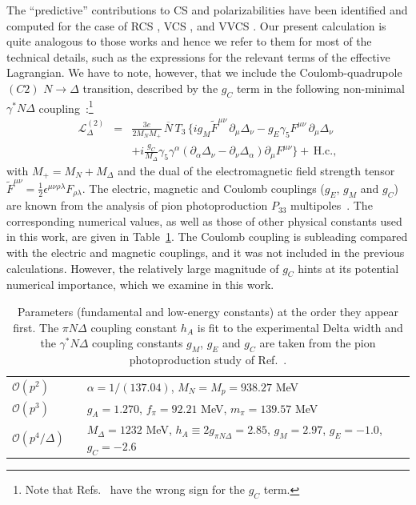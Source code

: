 \documentclass[11pt,preprint,tightenlines,
showpacs,preprintnumbers,amsmath,amssymb,superscriptaddress,a4paper,nofootinbib]{revtex4-1}
\def\bea{\begin{eqnarray}}
\def\eea{\end{eqnarray}}
\def\eqlab#1{\label{eq:#1}}
\def\nn{\nonumber}
\begin{document}
The ``predictive'' contributions to CS and polarizabilities have been identified  and computed  for the case
of RCS \cite{Lensky:2009uv}, 
VCS \cite{Lensky:2016nui}, and  VVCS \cite{Lensky:2014dda}.
Our present calculation is quite analogous to those works and hence 
we refer to them for most of the technical details, such as the expressions for the
relevant terms of the effective Lagrangian. We have to note, however,
that we include the Coulomb-quadrupole $(C2)$ $N\to \Delta$ transition,
described by the $g_C$ term in the following non-minimal $\gamma^* N \Delta$ coupling~\cite{Pascalutsa:2005vq,Pascalutsa:2005ts}:\footnote{Note that Refs.~\cite{Pascalutsa:2005ts,Pascalutsa:2005vq,Pascalutsa:2006up} have the wrong sign for the $g_C$ term.}
\bea
\mathcal{L}^{(2)}_\Delta &=&  \frac{3e}{2M_N M_+}\,\overline N\, T_3\,\Big\{
i g_M  \tilde F^{\mu\nu} \,\partial_{\mu}\Delta_\nu- g_E \gamma_5 F^{\mu\nu}\,\partial_{\mu}\Delta_\nu\eqlab{gammaNDeltaLag}\\
&& +i \frac{g_C}{M_\Delta}\gamma_5 \gamma^\alpha (\partial_\alpha \Delta_\nu-\partial_\nu \Delta_\alpha)\partial_\mu F^{\mu \nu}\Big\}+\,\mbox{H.c.},
\nn
\eea
with $M_+=M_N+M_\Delta$ and the dual of the electromagnetic field strength tensor
 $\tilde F^{\mu\nu}=\frac{1}{2}\epsilon^{\mu\nu\rho\lambda}F_{\rho\lambda}$.
The electric, magnetic and Coulomb couplings ($g_E$, $g_M$ and $g_C$)
are known from the analysis of pion photoproduction $P_{33}$ multipoles~\cite{Pascalutsa:2005ts}.
The corresponding numerical values, as well as those of other physical constants used in this work, are given in Table~\ref{tab:constants}. The Coulomb coupling is subleading
compared with the electric and magnetic couplings, and it was not included in the previous calculations.
However, the relatively large magnitude of $g_C$ hints at its potential numerical importance,
which we examine in this work.

\begin{table}[b]
\caption{Parameters (fundamental and low-energy constants) \cite{Agashe:2014kda} at the order they appear first. The $\pi N\Delta$ coupling constant $h_A$ is fit to the experimental Delta width and the $\gamma^* N \Delta$ coupling constants $g_M$, $g_E$ and $g_C$ are taken from the pion photoproduction study of Ref.~\cite{Pascalutsa:2005vq}.\label{tab:constants}} 
\begin{tabular}{lp{0.3cm}l}
\hline
$\mathcal{O}(p^2)$&&$\alpha=1/(137.04)$, $M_N=M_p=938.27$ MeV\\
$\mathcal{O}(p^3)$&&$g_A=1.270$, $f_\pi=92.21$ MeV, $m_\pi=139.57$ MeV \\
$\mathcal{O}(p^4/\varDelta)$&&$M_\Delta=1232$ MeV, $h_A\equiv 2g_{\pi N \Delta}=2.85$, $g_M=2.97$, $g_E=-1.0$, $g_C=-2.6$\\
\hline
\end{tabular}
\end{table}
\end{document}
